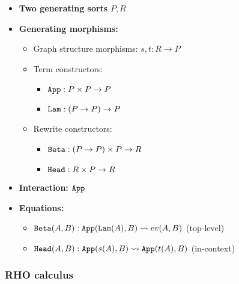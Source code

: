 \documentclass{article}
\begin{document}
\begin{itemize}
    \item \textbf{Two generating sorts} $P, R$
    \item \textbf{Generating morphisms:}
    \begin{itemize}
        \item Graph structure morphisms: $s, t : R \to P$
        \item Term constructors: 
        \begin{itemize}
            \item ${\tt App} : P \times P \to P$
            \item ${\tt Lam} : (P \to P) \to P$
        \end{itemize}
        \item Rewrite constructors:
        \begin{itemize}
            \item ${\tt Beta} : (P \to P) \times P \to R$
            \item ${\tt Head} : R \times P \to R$
        \end{itemize}
    \end{itemize}
    \item \textbf{Interaction:} ${\tt App}$
    \item \textbf{Equations:}
    \begin{itemize}
        \item ${\tt Beta}(A, B) : {\tt App}({\tt Lam}(A), B) \leadsto ev(A, B)$ (top-level)
        \item ${\tt Head}(A, B) : {\tt App}(s(A), B) \leadsto {\tt App}(t(A), B)$ (in-context)
    \end{itemize}
\end{itemize}

\subsubsection{RHO calculus}
\end{document}
